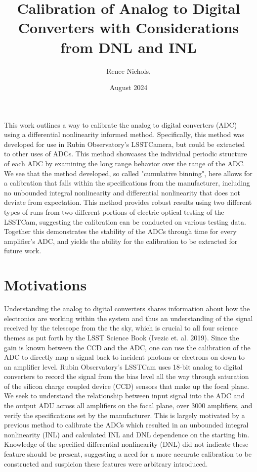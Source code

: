 \documentclass[11pt, letterpaper]{article}
\title{Calibration of Analog to Digital Converters with Considerations from DNL and INL}
\author{Renee Nichols, }
\date{August 2024}
\begin{document}
\maketitle 

This work outlines a way to calibrate the analog to digital converters (ADC) using a differential nonlinearity informed method. 
Specifically, this method was developed for use in Rubin Observatory's LSSTCamera, but could be extracted to other uses of ADCs. 
This method showcases the individual periodic structure of each ADC by examining the long range behavior over the range of the ADC. 
We see that the method developed, so called "cumulative binning", here allows for a calibration that falls within the specifications from the manufacturer, including no unbounded integral nonlinearity and differential nonlinearity that does not deviate from expectation. 
This method provides robust results using two different types of runs from two different portions of electric-optical testing of the LSSTCam, suggesting the calibration can be conducted on various testing data.
Together this demonstrates the stability of the ADCs through time for every amplifier's ADC, and yields the ability for the calibration to be extracted for future work.

\section{Motivations}
\label{sec: Motivations}
\indent

 
Understanding the analog to digital converters shares information about how the electronics are working within the system and thus an understanding of the signal received by the telescope from the the sky, which is crucial to all four science themes as put forth by the LSST Science Book (Ivezic et. al. 2019). 
Since the gain is known between the CCD and the ADC, one can use the calibration of the ADC to directly map a signal back to incident photons or electrons on down to an amplifier level.
Rubin Observatory’s LSSTCam uses 18-bit analog to digital converters to record the signal from the bias level all the way through saturation of the silicon charge coupled device (CCD) sensors that make up the focal plane. 
We seek to understand the relationship between input signal into the ADC and the output ADU across all amplifiers on the focal plane, over 3000 amplifiers, and verify the specifications set by the manufacturer. 
This is largely motivated by a previous method to calibrate the ADCs which resulted in an unbounded integral nonlinearity (INL) and calculated INL and DNL dependence on the starting bin.
Knowledge of the specified differential nonlinearity (DNL) did not indicate these feature should be present, suggesting a need for a more accurate calibration to be constructed and suspicion these features were arbitrary introduced. 
\end{document}
